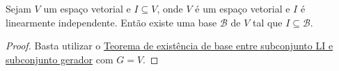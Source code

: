 \begin{theorem}
	Sejam $V$ um espaço vetorial e $I\subseteq V$, onde $V$ é um espaço vetorial e $I$ é linearmente independente. Então existe uma base $\mathcal{B}$ de $V$ tal que $I\subseteq\mathcal{B}$.
\end{theorem}
\begin{proof}
	Basta utilizar o \href{http://mtm.ufsc.br/~cordeiro/ensino/mtm3112.algebra.linear/06.bases/teo_base_entre_li_e_gerador_moodle.html}{Teorema de existência de base entre subconjunto LI e subconjunto gerador} com $G=V$.
\end{proof}